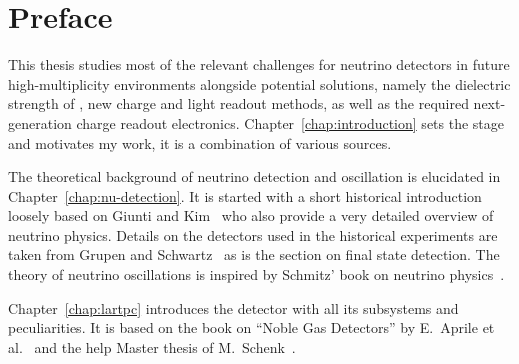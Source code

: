 \renewcommand{\Chapter}{{Preface}}
\chapter*{\Chapter}
\chaptermark{\Chapter}

This thesis studies most of the relevant challenges for \lartpc{} neutrino detectors in future high-multiplicity environments alongside potential solutions, namely the dielectric strength of \lar{}, new charge and light readout methods, as well as the required next-generation charge readout electronics.
Chapter~\ref{chap:introduction} sets the stage and motivates my work, it is a combination of various sources.

The theoretical background of neutrino detection and oscillation is elucidated in Chapter~\ref{chap:nu-detection}.
It is started with a short historical introduction loosely based on Giunti and Kim~\cite{giunti} who also provide a very detailed overview of neutrino physics.
Details on the detectors used in the historical experiments are taken from Grupen and Schwartz~\cite{grupen} as is the section on final state detection.
The theory of neutrino oscillations is inspired by Schmitz' book on neutrino physics~\cite{schmitz}.

Chapter~\ref{chap:lartpc} introduces the \lartpc{} detector with all its subsystems and peculiarities.
It is based on the book on ``Noble Gas Detectors'' by E.\ Aprile et al.~\cite{NobleGasDetectors} and the \gls{help} Master thesis of M.\ Schenk~\cite{michu}.


